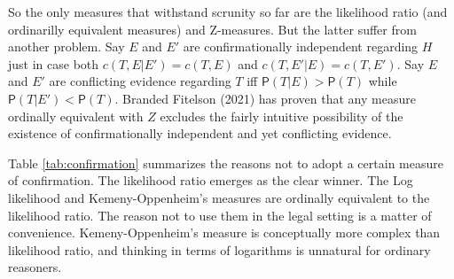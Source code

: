 \documentclass[
  10pt,
  dvipsnames,enabledeprecatedfontcommands]{scrartcl}
\newcommand{\pr}[1]{\mathsf{P}(#1)}
\begin{document}
So the only measures that withstand scrunity so far are the likelihood
ratio (and ordinarilly equivalent measures) and Z-measures. But the
latter suffer from another problem. Say \(E\) and \(E'\) are
confirmationally independent regarding \(H\) just in case both
\(c(T, E \vert E' ) = c(T, E )\) and \(c(T, E' \vert E ) = c(T, E')\).
Say \(E\) and \(E'\) are conflicting evidence regarding \(T\) iff
\(\pr{T\vert E}> \pr{T}\) while \(\pr{T\vert E'} < \pr{T}\). Branded
Fitelson (2021) has proven that any measure ordinally equivalent with
\(Z\) excludes the fairly intuitive possibility of the existence of
confirmationally independent and yet conflicting evidence.

Table \ref{tab:confirmation} summarizes the reasons not to adopt a
certain measure of confirmation. The likelihood ratio emerges as the
clear winner. The Log likelihood and Kemeny-Oppenheim's measures are
ordinally equivalent to the likelihood ratio. The reason not to use them
in the legal setting is a matter of convenience. Kemeny-Oppenheim's
measure is conceptually more complex than likelihood ratio, and thinking
in terms of logarithms is unnatural for ordinary reasoners.
\end{document}
